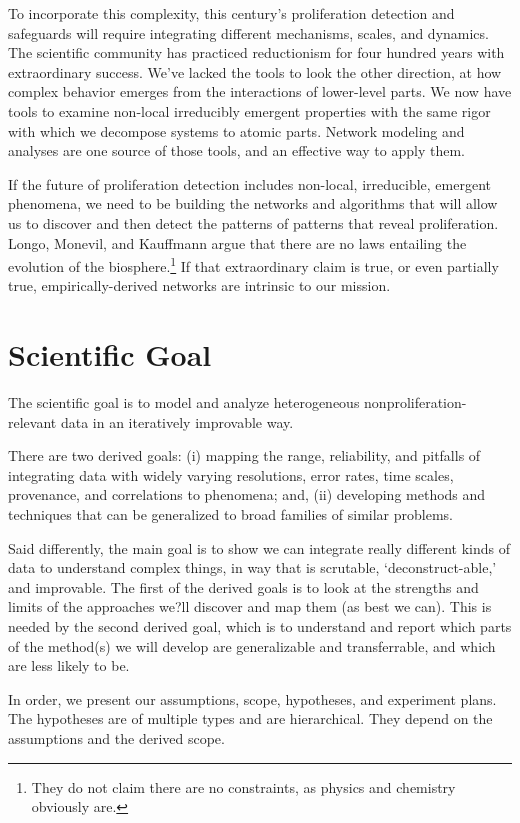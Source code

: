 \documentclass{article} %
\begin{document}
To incorporate this complexity, this century's proliferation detection and safeguards will require integrating different mechanisms, scales, and dynamics. The scientific community has practiced reductionism for four hundred years with extraordinary success. We've lacked the tools to look the other direction, at how complex behavior emerges from the interactions of lower-level parts. We now have tools to examine non-local irreducibly emergent properties with the same rigor with which we decompose systems to atomic parts. Network modeling and analyses are one source of those tools, and an effective way to apply them.

If the future of proliferation detection includes non-local, irreducible, emergent phenomena, we need to be building the networks and algorithms that will allow us to discover and then detect the patterns of patterns that  reveal proliferation. Longo, Monevil, and Kauffmann argue that there are no laws entailing the evolution of the biosphere.\footnote{They do not claim there are no constraints, as physics and chemistry obviously are.} If that extraordinary claim is true, or even partially true, empirically-derived networks are intrinsic to our mission.

\pagebreak
\section{Scientific Goal}
The scientific goal is to model and analyze heterogeneous nonproliferation-relevant data in an iteratively improvable way. 

There are two derived goals: (i) mapping the range, reliability, and pitfalls of integrating data with widely varying resolutions, error rates, time scales, provenance, and correlations to phenomena; and, (ii) developing methods and techniques that can be generalized to broad families of similar problems.

Said differently, the main goal is to show we can integrate really different kinds of data to understand complex things, in way that is scrutable, `deconstruct-able,' and improvable. The first of the derived goals is to look at the strengths and limits of the approaches we?ll discover and map them (as best we can). This is needed by the second derived goal, which is to understand and report which parts of the method(s) we will develop are generalizable and transferrable, and which are less likely to be.

In order, we present our assumptions, scope, hypotheses, and experiment plans. The hypotheses are of multiple types and are hierarchical. They depend on the assumptions and the derived scope.
\end{document}
